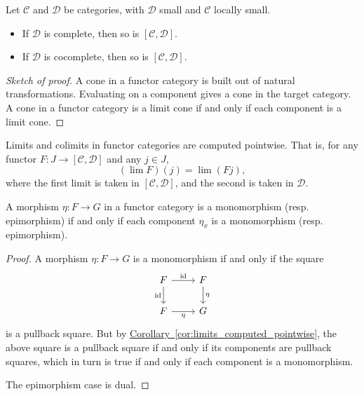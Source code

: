 \documentclass[main.tex]{subfiles}
\begin{document}
\begin{theorem}
  \label{thm:functor_categories_complete_cocomplete}
  Let $\mathcal{C}$ and $\mathcal{D}$ be categories, with $\mathcal{D}$ small and $\mathcal{C}$ locally small.
  \begin{itemize}
    \item If $\mathcal{D}$ is complete, then so is $[\mathcal{C}, \mathcal{D}]$.

    \item If $\mathcal{D}$ is cocomplete, then so is $[\mathcal{C}, \mathcal{D}]$.
  \end{itemize}
\end{theorem}
\begin{proof}[Sketch of proof]
  A cone in a functor category is built out of natural transformations. Evaluating on a component gives a cone in the target category. A cone in a functor category is a limit cone if and only if each component is a limit cone.
\end{proof}

\begin{corollary}
  \label{cor:limits_computed_pointwise}
  Limits and colimits in functor categories are computed pointwise. That is, for any functor $F\colon J \to [\mathcal{C}, \mathcal{D}]$ and any $j \in J$,
  \begin{equation*}
    (\lim F)(j) = \lim (Fj),
  \end{equation*}
  where the first limit is taken in $[\mathcal{C}, \mathcal{D}]$, and the second is taken in $\mathcal{D}$.
\end{corollary}

\begin{corollary}
  \label{cor:monos_epis_in_functor_category_preserved_pointwise}
  A morphism $\eta\colon F \to G$ in a functor category is a monomorphism (resp. epimorphism) if and only if each component $\eta_{x}$ is a monomorphism (resp. epimorphism).
\end{corollary}
\begin{proof}
  A morphism $\eta\colon F \to G$ is a monomorphism if and only if the square
  \begin{equation*}
    \begin{tikzcd}
      F
      \arrow[r, "\id"]
      \arrow[d, swap, "\id"]
      & F
      \arrow[d, "\eta"]
      \\
      F
      \arrow[r, swap, "\eta"]
      & G
    \end{tikzcd}
  \end{equation*}
  is a pullback square. But by \hyperref[cor:limits_computed_pointwise]{Corollary~\ref*{cor:limits_computed_pointwise}}, the above square is a pullback square if and only if its components are pullback squares, which in turn is true if and only if each component is a monomorphism.

  The epimorphism case is dual.
\end{proof}
\end{document}
